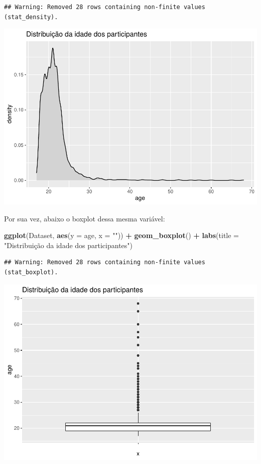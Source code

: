 \documentclass[
]{book}
\newenvironment{Shaded}{\begin{snugshade}}{\end{snugshade}}
\newcommand{\DataTypeTok}[1]{\textcolor[rgb]{0.13,0.29,0.53}{#1}}
\newcommand{\KeywordTok}[1]{\textcolor[rgb]{0.13,0.29,0.53}{\textbf{#1}}}
\newcommand{\NormalTok}[1]{#1}
\newcommand{\OperatorTok}[1]{\textcolor[rgb]{0.81,0.36,0.00}{\textbf{#1}}}
\newcommand{\StringTok}[1]{\textcolor[rgb]{0.31,0.60,0.02}{#1}}
\begin{document}
\begin{verbatim}
## Warning: Removed 28 rows containing non-finite values (stat_density).
\end{verbatim}

\begin{center}\includegraphics{gitbook-demo_files/figure-latex/unnamed-chunk-17-1} \end{center}

Por sua vez, abaixo o boxplot dessa mesma variável:

\begin{Shaded}
\begin{Highlighting}[]
\KeywordTok{ggplot}\NormalTok{(Dataset, }\KeywordTok{aes}\NormalTok{(}\DataTypeTok{y =}\NormalTok{ age, }\DataTypeTok{x =} \StringTok{""}\NormalTok{)) }\OperatorTok{+}
\StringTok{  }\KeywordTok{geom_boxplot}\NormalTok{() }\OperatorTok{+}
\StringTok{  }\KeywordTok{labs}\NormalTok{(}\DataTypeTok{title =} \StringTok{"Distribuição da idade dos participantes"}\NormalTok{)}
\end{Highlighting}
\end{Shaded}

\begin{verbatim}
## Warning: Removed 28 rows containing non-finite values (stat_boxplot).
\end{verbatim}

\begin{center}\includegraphics{gitbook-demo_files/figure-latex/unnamed-chunk-18-1} \end{center}
\end{document}
